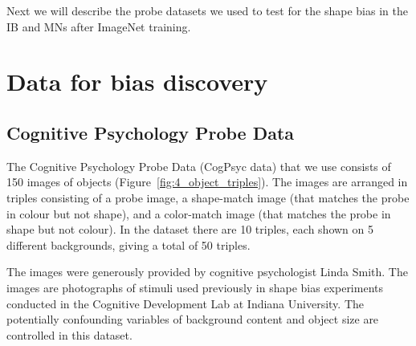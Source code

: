 \documentclass{article}
\begin{document}
Next we will describe the probe datasets we used to test for the shape bias in the IB and MNs after ImageNet training.


\section{Data for bias discovery}\label{sec:dataset}\subsection{Cognitive Psychology Probe Data}

The Cognitive Psychology Probe Data (CogPsyc data) that we use consists of 150 images of objects (Figure~\ref{fig:4_object_triples}). The images are arranged in triples consisting of a probe image, a shape-match image (that matches the probe in colour but not shape), and a color-match image (that matches the probe in shape but not colour). In the dataset there are 10 triples, each shown on 5 different backgrounds, giving a total of 50 triples.\footnotemark{}

The images were generously provided by cognitive psychologist Linda Smith. The images are photographs of stimuli used previously in shape bias experiments conducted in the Cognitive Development Lab at Indiana University. The potentially confounding variables of background content and object size are controlled in this dataset.
\end{document}
